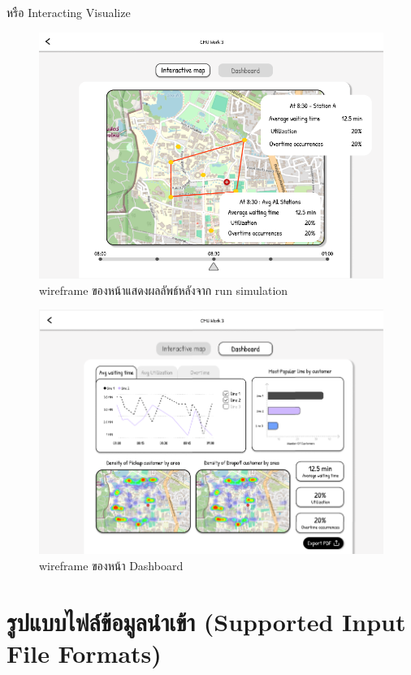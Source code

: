 \begin{mypara}
\begin{itemize}
    หรือ Interacting Visualize
    \begin{figure}[H]
    \centering
    \includegraphics[scale=0.4]{output_show.png}
    \caption{wireframe ของหน้าแสดงผลลัพธ์หลังจาก run simulation}
    \label{fig:WireframeOutputLogin}
    \end{figure}
    \begin{figure}[H]
    \centering
    \includegraphics[scale=0.4]{dashboard.png}
    \caption{wireframe ของหน้า Dashboard }
    \label{fig:WireframeDashboardLogin}
    \end{figure}
    \end{itemize}

\end{mypara}
\section{รูปแบบไฟล์ข้อมูลนำเข้า (Supported Input File Formats)}
